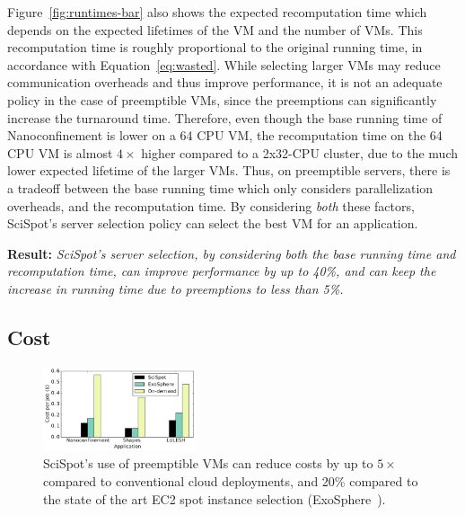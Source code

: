 \documentclass[compsoc]{IEEEtran}
\newcommand{\sysname}{SciSpot\xspace}
\newcommand{\myfigspace}[0]{-0.45cm}
\begin{document}
Figure~\ref{fig:runtimes-bar} also shows the expected recomputation time which depends on the expected lifetimes of the VM and the number of VMs. 
This recomputation time is roughly proportional to the original running time, in accordance with Equation~\ref{eq:wasted}. 
While selecting larger VMs may reduce communication overheads and thus improve performance, it is not an adequate policy in the case of preemptible VMs, since the preemptions can significantly increase the turnaround time.
Therefore, even though the base running time of Nanoconfinement is lower on a 64 CPU VM, the recomputation time on the 64 CPU VM is almost $4\times$ higher compared to a 2x32-CPU cluster,  due to the much lower expected lifetime of the larger VMs. 
Thus, on preemptible servers, there is a tradeoff between the base running time which only considers parallelization overheads, and the recomputation time.
By considering \emph{both} these factors, \sysname's server selection policy can select the best VM for an application. 


\noindent \textbf{Result:} \emph{SciSpot's server selection, by considering both the base running time and recomputation time, can improve performance by up to 40\%, and can keep the increase in running time due to preemptions to less than 5\%.}

\subsection{Cost}

\begin{figure}
  \centering
  \includegraphics[width=0.4\textwidth]{cost-vs-exosphere.pdf}
  \vspace*{\myfigspace}
  \caption{SciSpot's use of preemptible VMs can reduce costs by up to $5\times$ compared to conventional cloud deployments, and 20\% compared to the state of the art EC2 spot instance selection (ExoSphere~\cite{exosphere}).}
  \label{fig:cost-only-bar}
    \vspace*{\myfigspace}
\end{figure}
\end{document}
